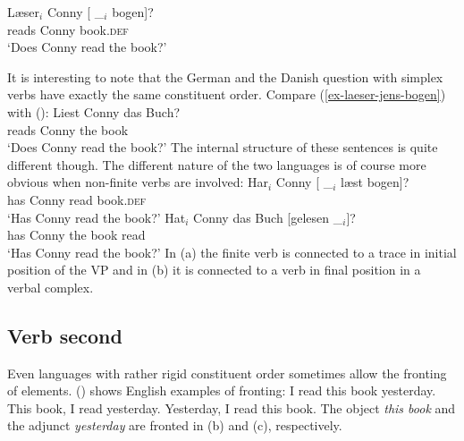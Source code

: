 \ex
\gll Læser$_i$ Conny [ \_$_i$ bogen]?\\
     reads     Conny {}        {}     book.\textsc{def}\\
\glt `Does Conny read the book?'
\zl

It is interesting to note that the German and the Danish question with simplex verbs have exactly
the same constituent order. Compare (\ref{ex-laeser-jens-bogen}) with ():
\ea
\gll Liest Conny das Buch?\\
     reads Conny the book\\ \german
\glt `Does Conny read the book?'
\z
The internal structure of these sentences is quite different though. The different nature of the two
languages is of course more obvious when non-finite verbs are involved:
\eal
\ex
\gll Har$_i$ Conny [ \_$_i$ læst bogen]?\\
     has Conny {} {} read book.\textsc{def}\\\danish
\glt `Has Conny read the book?'
\ex
\gll Hat$_i$ Conny das Buch [gelesen \_$_i$]?\\
     has Conny the book \spacebr{}read\\ \german
\glt `Has Conny read the book?'
\zl
In (a) the finite verb is connected to a trace in initial position of the VP and in
(b) it is connected to a verb in final position in a verbal complex.


\subsection{Verb second}
\label{sce-verb-second}

Even languages with rather rigid constituent order sometimes allow the fronting of elements.
() shows English examples of fronting:
\eal
\ex I read this book yesterday.
\ex This book, I read yesterday.
\ex Yesterday, I read this book.
\zl
The object \emph{this book} and the adjunct \emph{yesterday} are fronted in (b) and
(c), respectively.

